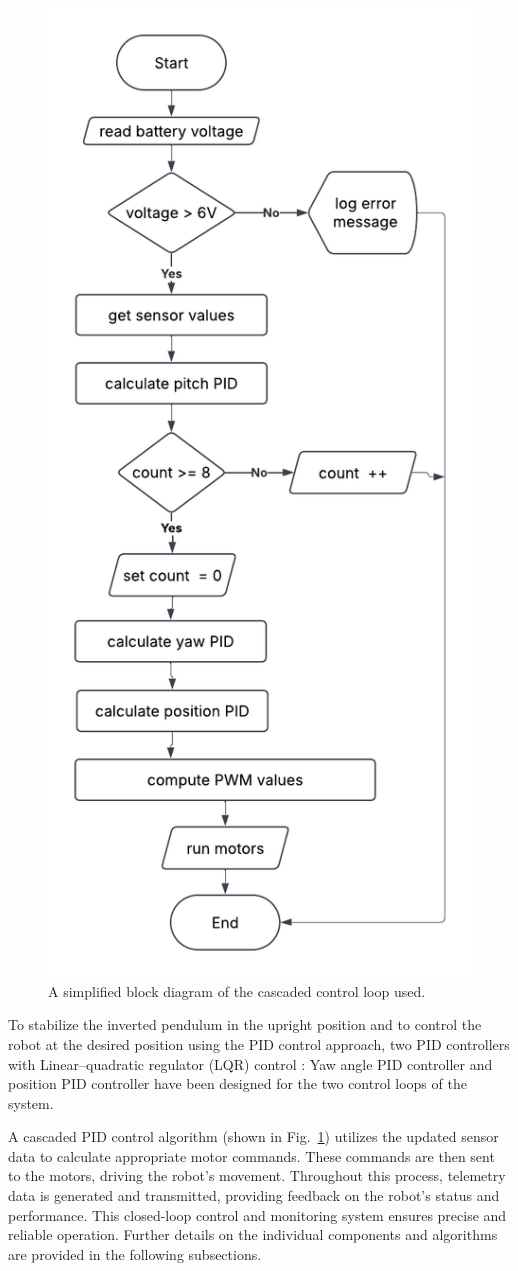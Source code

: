 \begin{figure}[h]
	\centering
	\includegraphics[width=0.5\linewidth]{assets/control_loop_diagram.png}
	\caption{A simplified block diagram of the cascaded control loop used. }
	\label{fig:control-loop}
\end{figure}

To stabilize the inverted pendulum in the upright position and to control the robot at the desired position using the PID control approach, two PID controllers with Linear–quadratic regulator (LQR) control : Yaw angle PID controller and position PID controller have been designed for the two control loops of the system.

A cascaded PID control algorithm (shown in Fig.~\ref{fig:control-loop}) utilizes the updated sensor data to calculate appropriate motor commands. These commands are then sent to the motors, driving the robot's movement.  Throughout this process, telemetry data is generated and transmitted, providing feedback on the robot's status and performance.  This closed-loop control and monitoring system ensures precise and reliable operation. Further details on the individual components and algorithms are provided in the following subsections.
